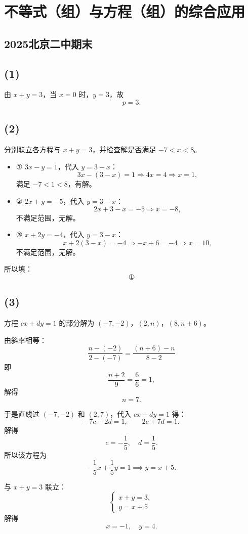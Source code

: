 \section{不等式（组）与方程（组）的综合应用}

\subsection{2025北京二中期末}
\label{2025北京二中期末}
\subsection*{(1)}
由 \(x+y=3\)，当 \(x=0\) 时，\(y=3\)，故
\[
p=3.
\]

\subsection*{(2)}
分别联立各方程与 \(x+y=3\)，并检查解是否满足 \(-7<x<8\)。

\begin{itemize}
    \item ① \(3x-y=1\)，代入 \(y=3-x\)：
    \[
    3x-(3-x)=1 \Rightarrow 4x=4 \Rightarrow x=1,
    \]
    满足 \(-7<1<8\)，有解。

    \item ② \(2x+y=-5\)，代入 \(y=3-x\)：
    \[
    2x+3-x=-5 \Rightarrow x=-8,
    \]
    不满足范围，无解。

    \item ③ \(x+2y=-4\)，代入 \(y=3-x\)：
    \[
    x+2(3-x)=-4 \Rightarrow -x+6=-4 \Rightarrow x=10,
    \]
    不满足范围，无解。
\end{itemize}

所以填：
\[
\boxed{①}
\]

\subsection*{(3)}
方程 \(cx+dy=1\) 的部分解为 \((-7,-2)\)，\((2,n)\)，\((8,n+6)\)。

由斜率相等：
\[
\frac{n-(-2)}{2-(-7)} = \frac{(n+6)-n}{8-2}
\]
即
\[
\frac{n+2}{9} = \frac{6}{6} = 1,
\]
解得
\[
n=7.
\]

于是直线过 \((-7,-2)\) 和 \((2,7)\)，代入 \(cx+dy=1\) 得：
\[
-7c-2d=1,\qquad 2c+7d=1.
\]
解得
\[
c=-\frac15,\quad d=\frac15.
\]
所以该方程为
\[
-\frac15 x + \frac15 y = 1 \implies y=x+5.
\]

与 \(x+y=3\) 联立：
\[
\begin{cases}
x+y=3,\\
y=x+5
\end{cases}
\]
解得
\[
x=-1,\quad y=4.
\]

